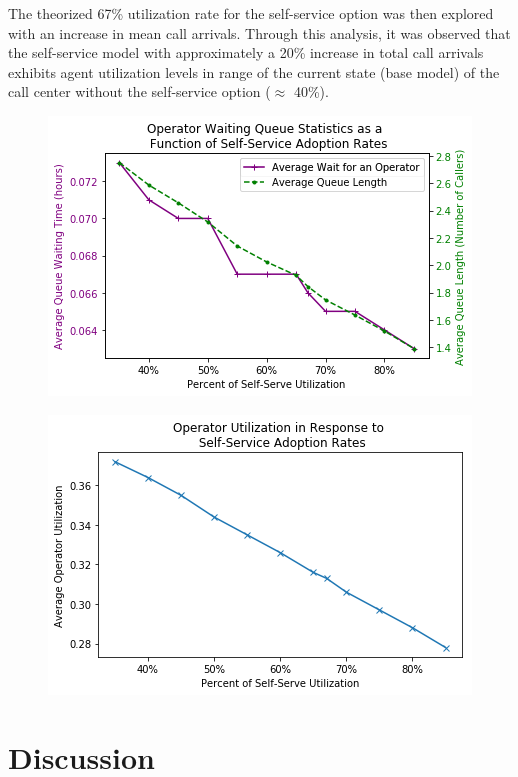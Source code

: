 \documentclass[12pt,twocolumn]{article}
\begin{document}
	\par
	
	The theorized 67\% utilization rate for the self-service option was then explored with an increase in mean call arrivals.  Through this analysis, it was observed that the self-service model with approximately a 20\% increase in total call arrivals exhibits agent utilization levels in range of the current state (base model) of the call center without the self-service option ($\approx$ 40\%).

\begin{figure}[h]
	\includegraphics[scale=.5]{self_serve_results.png}
	\caption{}
\end{figure}


\begin{figure}[h]
	\includegraphics[scale=.5]{op_self_serve.png}
	\caption{}
\end{figure}



\section{Discussion}
\end{document}
